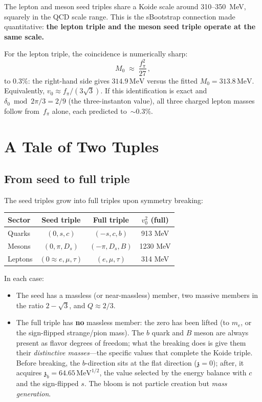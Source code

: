 \documentclass[12pt,a4paper]{article}
\newcommand{\MeV}{\,\text{MeV}}
\newcommand{\fpi}{f_\pi}
\newcommand{\zch}{\mathfrak{z}}
\begin{document}
The lepton and meson seed triples share a Koide scale around
310--350~MeV, squarely in the QCD scale range. This is the
sBootstrap connection made quantitative: \textbf{the lepton triple
and the meson seed triple operate at the same scale.}

For the lepton triple, the coincidence is numerically sharp:
\begin{equation}
M_0 \;\approx\; \frac{\fpi^2}{27}\,,
\end{equation}
to $0.3\%$: the right-hand side gives $314.9\MeV$ versus
the fitted $M_0 = 313.8\MeV$.  Equivalently,
$v_0 \approx \fpi/(3\sqrt{3})$.  If this identification is exact
and $\delta_0 \bmod 2\pi/3 = 2/9$ (the three-instanton value),
all three charged lepton masses follow from~$\fpi$ alone,
each predicted to~${\sim}0.3\%$.

\section{A Tale of Two Tuples}
\label{sec:two_tuples}

\subsection{From seed to full triple}

The seed triples grow into full triples upon symmetry breaking:

\begin{center}
\begin{tabular}{lccc}
\toprule
Sector & Seed triple & Full triple & $v_0^2$ (full) \\
\midrule
Quarks & $(0, s, c)$ & $(-s, c, b)$ & 913 MeV \\
Mesons & $(0, \pi, D_s)$ & $(-\pi, D_s, B)$ & 1230 MeV \\
Leptons & $(0 \approx e, \mu, \tau)$ & $(e, \mu, \tau)$ & 314 MeV \\
\bottomrule
\end{tabular}
\end{center}

In each case:
\begin{itemize}
\item The seed has a massless (or near-massless) member, two massive 
members in the ratio $2 - \sqrt{3}$, and $Q \approx 2/3$.
\item The full triple has \textbf{no} massless member: the zero has 
been lifted (to $m_e$, or the sign-flipped strange/pion mass). The 
$b$ quark and $B$ meson are always present as flavor degrees of 
freedom; what the breaking does is give them their \emph{distinctive 
masses}---the specific values that complete the Koide triple. Before 
breaking, the $b$-direction sits at the flat direction ($\zch = 0$); 
after, it acquires $\zch_b = 64.65\MeV^{1/2}$, the value selected 
by the energy balance with $c$ and the sign-flipped $s$. The bloom 
is not particle creation but \emph{mass generation}.
\end{itemize}
\end{document}
